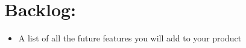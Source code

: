 \section{Backlog:}
\begin{itemize}
    \item A list of all the future features you will add to your product
\end{itemize}